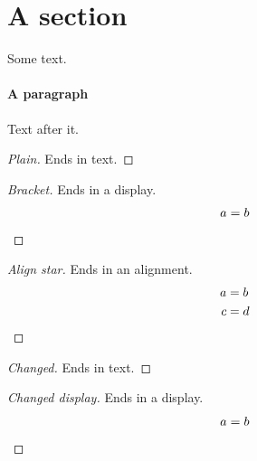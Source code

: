 \documentclass{amsart}
\begin{document}
\section{A section}
Some text.
\paragraph{A paragraph} Text after it.
\begin{proof}[Plain]
Ends in text.
\end{proof}
\begin{proof}[Bracket]
Ends in a display.
\[ a = b \qedhere \]
\end{proof}
\begin{proof}[Align star]
Ends in an alignment.
\begin{align*} a &= b \\ c &= d \qedhere \end{align*}
\end{proof}
\renewcommand{\qedsymbol}{$\blacksquare$}
\begin{proof}[Changed]
Ends in text.
\end{proof}
\begin{proof}[Changed display]
Ends in a display.
\[ a = b \qedhere \]
\end{proof}
\end{document}
